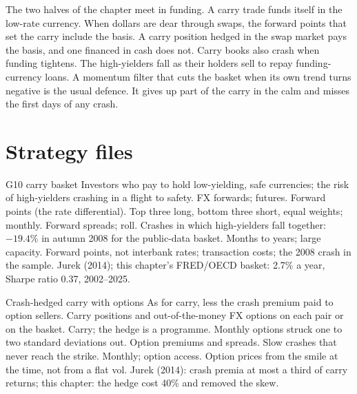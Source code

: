 The two halves of the chapter meet in funding. A carry trade funds itself in the low-rate currency. When dollars are dear through swaps, the forward
points that set the carry include the basis. A carry position hedged in the swap market pays the basis, and one financed in cash does not. Carry books
also crash when funding tightens. The high-yielders fall as their holders sell to repay funding-currency loans. A momentum filter that cuts the
basket when its own trend turns negative is the usual defence. It gives up part of the carry in the calm and misses the first days of any crash.

\section{Strategy files}

\begin{strategyfile}{G10 carry basket}\label{strat:s2:cross-currency-basis-and-fx-carry:basket}
 Investors who pay to hold low-yielding, safe currencies; the risk of high-yielders crashing in a flight to safety.
 FX forwards; futures.
 Forward points (the rate differential).
 Top three long, bottom three short, equal weights; monthly.
 Forward spreads; roll.
 Crashes in which high-yielders fall together: $-19.4\%$ in autumn 2008 for the public-data basket.
 Months to years; large capacity.
 Forward points, not interbank rates; transaction costs; the 2008 crash in the sample.
 Jurek (2014); this chapter's FRED/OECD basket: 2.7\% a year, Sharpe ratio 0.37, 2002--2025.
\end{strategyfile}

\begin{strategyfile}{Crash-hedged carry with options}\label{strat:s2:cross-currency-basis-and-fx-carry:hedged}
 As for carry, less the crash premium paid to option sellers.
 Carry positions and out-of-the-money FX options on each pair or on the basket.
 Carry; the hedge is a programme.
 Monthly options struck one to two standard deviations out.
 Option premiums and spreads.
 Slow crashes that never reach the strike.
 Monthly; option access.
 Option prices from the smile at the time, not from a flat vol.
 Jurek (2014): crash premia at most a third of carry returns; this chapter: the hedge cost 40\% and removed the skew.
\end{strategyfile}

